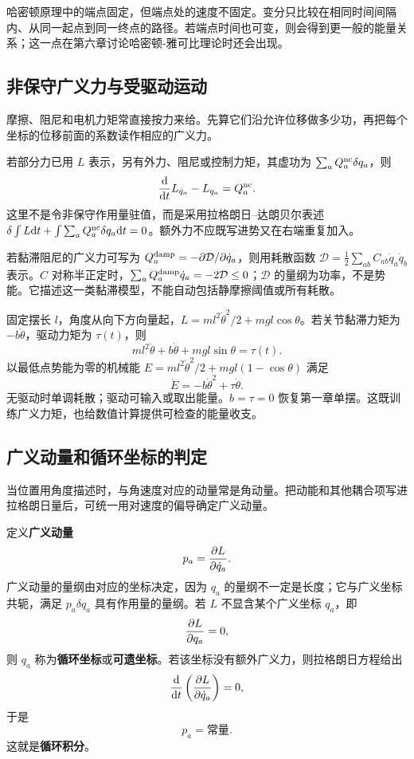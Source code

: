 \begin{remark}
哈密顿原理中的端点固定，但端点处的速度不固定。变分只比较在相同时间间隔内、从同一起点到同一终点的路径。若端点时间也可变，则会得到更一般的能量关系；这一点在第六章讨论哈密顿-雅可比理论时还会出现。
\end{remark}

\subsection{非保守广义力与受驱动运动}
摩擦、阻尼和电机力矩常直接按力来给。先算它们沿允许位移做多少功，再把每个坐标的位移前面的系数读作相应的广义力。

若部分力已用 $L$ 表示，另有外力、阻尼或控制力矩，其虚功为 $\sum_a Q_a^{\rm nc}\delta q_a$，则
\begin{equation}\label{eq:lag-nonconservative}
\frac{\mathrm{d}}{\mathrm{d} t}L_{\dot q_a}-L_{q_a}=Q_a^{\rm nc}.
\end{equation}
这里不是令非保守作用量驻值，而是采用拉格朗日--达朗贝尔表述 $\delta\int L\mathrm{d} t+\int\sum_a Q_a^{\rm nc}\delta q_a\mathrm{d} t=0$。额外力不应既写进势又在右端重复加入。

若黏滞阻尼的广义力可写为 $Q_a^{\rm damp}=-\partial\mathcal D/\partial\dot q_a$，则用耗散函数 $\mathcal D=\frac12\sum_{ab}C_{ab}\dot q_a\dot q_b$ 表示。$C$ 对称半正定时，$\sum_a Q_a^{\rm damp}\dot q_a=-2\mathcal D\le0$；$\mathcal D$ 的量纲为功率，不是势能。它描述这一类黏滞模型，不能自动包括静摩擦阈值或所有耗散。
\begin{example}[有阻尼和关节驱动力矩的单摆]
固定摆长 $l$，角度从向下方向量起，$L=ml^2\dot\theta^2/2+mgl\cos\theta$。若关节黏滞力矩为 $-b\dot\theta$，驱动力矩为 $\tau(t)$，则
\[
ml^2\ddot\theta+b\dot\theta+mgl\sin\theta=\tau(t).
\]
以最低点势能为零的机械能 $E=ml^2\dot\theta^2/2+mgl(1-\cos\theta)$ 满足
\[
\dot E=-b\dot\theta^2+\tau\dot\theta.
\]
无驱动时单调耗散；驱动可输入或取出能量。$b=\tau=0$ 恢复第一章单摆。这既训练广义力矩，也给数值计算提供可检查的能量收支。
\end{example}

\subsection{广义动量和循环坐标的判定}
当位置用角度描述时，与角速度对应的动量常是角动量。把动能和其他耦合项写进拉格朗日量后，可统一用对速度的偏导确定广义动量。

定义\textbf{广义动量}
\begin{equation}
p_a=\frac{\partial L}{\partial \dot q_a}.
\label{eq:generalized-momentum}
\end{equation}
广义动量的量纲由对应的坐标决定，因为 $q_a$ 的量纲不一定是长度；它与广义坐标共轭，满足 $p_a\delta q_a$ 具有作用量的量纲。若 $L$ 不显含某个广义坐标 $q_a$，即
\[
\frac{\partial L}{\partial q_a}=0,
\]
则 $q_a$ 称为\textbf{循环坐标}或\textbf{可遗坐标}。若该坐标没有额外广义力，则拉格朗日方程给出
\[
\frac{\mathrm{d}}{\mathrm{d} t}\left(\frac{\partial L}{\partial \dot q_a}\right)=0,
\]
于是
\begin{equation}
p_a=\text{常量}.
\label{eq:cyclic-integral}
\end{equation}
这就是\textbf{循环积分}。

